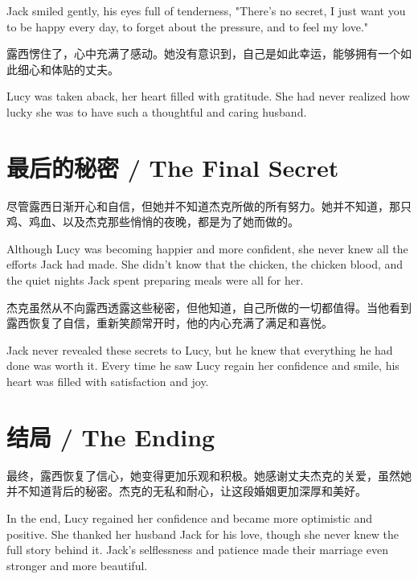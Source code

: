 \begin{flushright}
Jack smiled gently, his eyes full of tenderness, "There’s no secret, I just want you to be happy every day, to forget about the pressure, and to feel my love."
\end{flushright}

露西愣住了，心中充满了感动。她没有意识到，自己是如此幸运，能够拥有一个如此细心和体贴的丈夫。

\begin{flushright}
Lucy was taken aback, her heart filled with gratitude. She had never realized how lucky she was to have such a thoughtful and caring husband.
\end{flushright}

\section*{最后的秘密 / The Final Secret}

尽管露西日渐开心和自信，但她并不知道杰克所做的所有努力。她并不知道，那只鸡、鸡血、以及杰克那些悄悄的夜晚，都是为了她而做的。

\begin{flushright}
Although Lucy was becoming happier and more confident, she never knew all the efforts Jack had made. She didn't know that the chicken, the chicken blood, and the quiet nights Jack spent preparing meals were all for her.
\end{flushright}

杰克虽然从不向露西透露这些秘密，但他知道，自己所做的一切都值得。当他看到露西恢复了自信，重新笑颜常开时，他的内心充满了满足和喜悦。

\begin{flushright}
Jack never revealed these secrets to Lucy, but he knew that everything he had done was worth it. Every time he saw Lucy regain her confidence and smile, his heart was filled with satisfaction and joy.
\end{flushright}

\section*{结局 / The Ending}

最终，露西恢复了信心，她变得更加乐观和积极。她感谢丈夫杰克的关爱，虽然她并不知道背后的秘密。杰克的无私和耐心，让这段婚姻更加深厚和美好。

\begin{flushright}
In the end, Lucy regained her confidence and became more optimistic and positive. She thanked her husband Jack for his love, though she never knew the full story behind it. Jack's selflessness and patience made their marriage even stronger and more beautiful.
\end{flushright}

